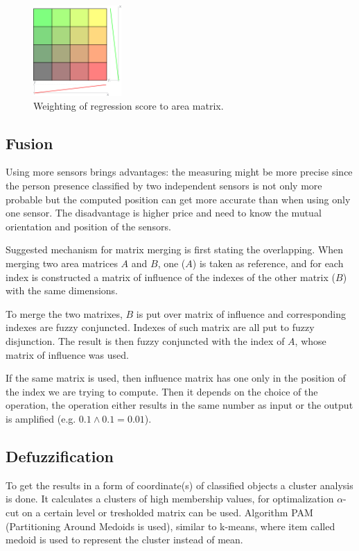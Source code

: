 \begin{figure}[h!]
\begin{center}
\includegraphics[width=0.3\textwidth]{img/pir_area.png}
\caption{Weighting of regression score to area matrix.\label{fig:areamatrixweighting}}
\end{center}
\end{figure}

\subsection*{Fusion}
Using more sensors brings advantages: the measuring might be more precise since the person presence
classified by two independent sensors is not only more probable but the computed position
can get more accurate than when using only one sensor. The disadvantage is higher price and need
to know the mutual orientation and position of the sensors.

Suggested mechanism for matrix merging is first stating the overlapping. When merging two
area matrices $A$ and $B$, one ($A$) is taken as reference, and for each index is constructed
a matrix of influence of the indexes of the other matrix ($B$) with the same dimensions.

To merge the two matrixes, $B$ is put over matrix of influence and corresponding indexes
are fuzzy conjuncted. Indexes of such matrix are all put to fuzzy disjunction.
The result is then fuzzy conjuncted with the index of $A$, whose matrix of influence was used.

If the same matrix is used, then influence matrix has one only in the position of the index
we are trying to compute. Then it depends on the choice of the operation, the operation
either results in the same number as input or the output is amplified (e.g. $0.1 \land 0.1 = 0.01$).


\subsection*{Defuzzification}

To get the results in a form of coordinate(s) of classified objects a cluster analysis is done. It calculates
a clusters of high membership values, for optimalization $\alpha$-cut on a certain level or tresholded
matrix can be used. Algorithm PAM (Partitioning Around Medoids is used), similar to k-means, where item called
medoid is used to represent the cluster instead of mean.

